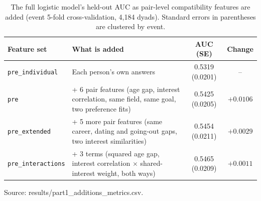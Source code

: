 \begin{table}[h]
\centering
\caption{The full logistic model's held-out AUC as pair-level compatibility features are added (event 5-fold
cross-validation, 4,184 dyads). Standard errors in parentheses are clustered by event.}
\label{tab:ladder}
\begin{tabular}{l p{} c c}
\toprule
Feature set & What is added & AUC (SE) & Change \\
\midrule
\texttt{pre\_individual} & Each person's own answers & 0.5319 (0.0201) & -- \\
\texttt{pre} & + 6 pair features (age gap, interest correlation, same field, same goal, two preference fits) & 0.5425 (0.0205) & $+0.0106$ \\
\texttt{pre\_extended} & + 5 more pair features (same career, dating and going-out gaps, two interest similarities) & 0.5454 (0.0211) & $+0.0029$ \\
\texttt{pre\_interactions} & + 3 terms (squared age gap, interest correlation $\times$ shared-interest weight, both ways) & 0.5465 (0.0209) & $+0.0011$ \\
\bottomrule
\end{tabular}

\smallskip
{\footnotesize Source: results/part1\_additions\_metrics.csv.}
\end{table}
